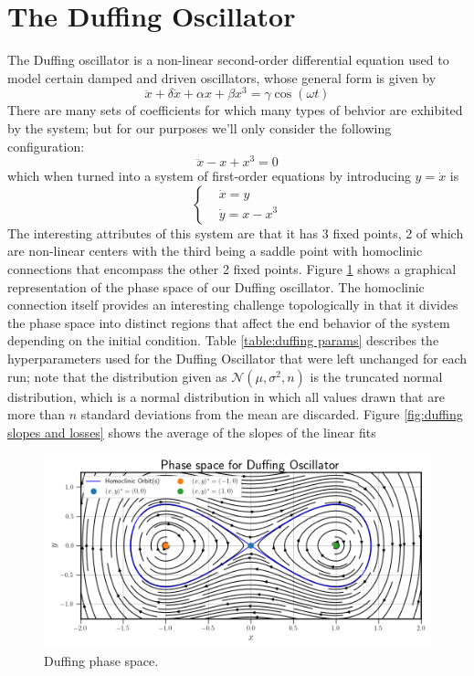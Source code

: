\section{The Duffing Oscillator}
The Duffing oscillator is a non-linear second-order differential equation used to model 
certain damped and driven oscillators, whose general form is given by
\begin{equation}
    \ddot{x} + \delta\dot{x} + \alpha x + \beta x^3 = \gamma\cos(\omega t)
\end{equation}
There are many sets of coefficients for which many types of behvior are exhibited by the
system; but for our purposes we'll only consider the following configuration:
\begin{equation}
    \ddot{x} - x + x^3 = 0
\end{equation}
which when turned into a system of first-order equations by introducing $y = \dot{x}$ is
\begin{equation}
    \begin{cases}
        & \dot{x} = y \\
        & \dot{y} = x - x^3  
    \end{cases}
\end{equation}
The interesting attributes of this system are that it has 3 fixed points, 2 of which are non-linear 
centers with the third being a saddle point with homoclinic connections that encompass the other 2 fixed 
points. Figure \ref{fig:duffing phase space} shows a graphical representation of the phase space of our 
Duffing oscillator. The homoclinic connection itself provides an interesting challenge topologically in 
that it divides the phase space into distinct regions that affect the end behavior of the system depending
on the initial condition. Table \ref{table:duffing params} describes the hyperparameters used for the 
Duffing Oscillator that were left unchanged for each run; note that the distribution given as 
$\mathcal{N}(\mu, \sigma^2, n)$ is the truncated normal distribution, which is a normal distribution
in which all values drawn that are more than $n$ standard deviations from the mean are discarded. 
Figure \ref{fig:duffing slopes and losses} shows the average of the slopes of the linear fits 
\begin{figure}[ht]
    \centering
    \begin{minipage}{\textwidth}
        \includegraphics[width=\textwidth]{"Figures/duffing_phase_space.png"}
    \end{minipage}
    \caption{Duffing phase space.}
    \label{fig:duffing phase space}
\end{figure}


